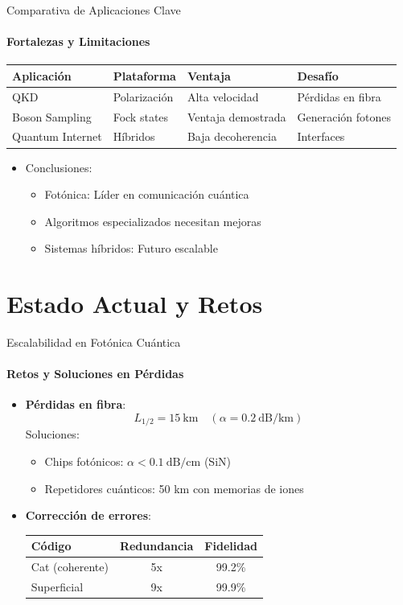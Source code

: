 \documentclass{beamer}
\begin{document}
\begin{frame}{Comparativa de Aplicaciones Clave}
\framesubtitle{Fortalezas y Limitaciones}

\begin{table}[h]
\centering
\small
\begin{tabular}{|l|l|l|l|}
\hline
\textbf{Aplicación} & \textbf{Plataforma} & \textbf{Ventaja} & \textbf{Desafío} \\
\hline
QKD & Polarización & Alta velocidad & Pérdidas en fibra \\
\hline
Boson Sampling & Fock states & Ventaja demostrada & Generación fotones \\
\hline
Quantum Internet & Híbridos & Baja decoherencia & Interfaces \\
\hline
\end{tabular}
\end{table}

\begin{itemize}
    \item Conclusiones:
    \begin{itemize}
        \item Fotónica: Líder en comunicación cuántica
        \item Algoritmos especializados necesitan mejoras
        \item Sistemas híbridos: Futuro escalable
    \end{itemize}
\end{itemize}
\end{frame}

\section{Estado Actual y Retos}
\begin{frame}{Escalabilidad en Fotónica Cuántica}
\framesubtitle{Retos y Soluciones en Pérdidas}

\begin{itemize}
    \item \textbf{Pérdidas en fibra}:
    \[
    L_{1/2} = 15\ \text{km} \quad (\alpha = 0.2\ \text{dB/km})
    \]
    Soluciones:
    \begin{itemize}
        \item Chips fotónicos: \( \alpha < 0.1\ \text{dB/cm} \) (SiN)
        \item Repetidores cuánticos: 50 km con memorias de iones
    \end{itemize}
    
    \item \textbf{Corrección de errores}:
    \begin{table}[h]
    \centering
    \small
    \begin{tabular}{|l|c|c|}
    \hline
    \textbf{Código} & Redundancia & Fidelidad \\
    \hline
    Cat (coherente) & 5x & 99.2\% \\
    Superficial & 9x & 99.9\% \\
    \hline
    \end{tabular}
    \end{table}
\end{itemize}
\end{frame}
\end{document}
